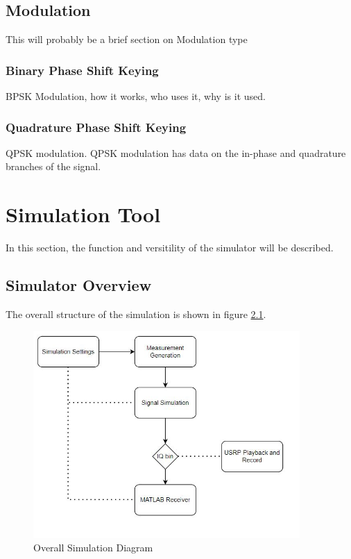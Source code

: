 \documentclass[12pt]{report}
\begin{document}
\section{Modulation}
This will probably be a brief section on Modulation type

\subsection{Binary Phase Shift Keying}

BPSK Modulation, how it works, who uses it, why is it used.

\subsection{Quadrature Phase Shift Keying}

QPSK modulation. QPSK modulation has data on the in-phase and quadrature branches of the signal.



\chapter {Simulation Tool}
In this section, the function and versitility of the simulator will be described.

\section{Simulator Overview}

The overall structure of the simulation is shown in figure \ref{fig:SimDiagram}.
\begin{figure}[ht]
    \centering
    \includegraphics[width=4.0in]{OverallSimulationDiagram}
    \caption{Overall Simulation Diagram}
    \label{fig:SimDiagram}
\end{figure}
\end{document}
